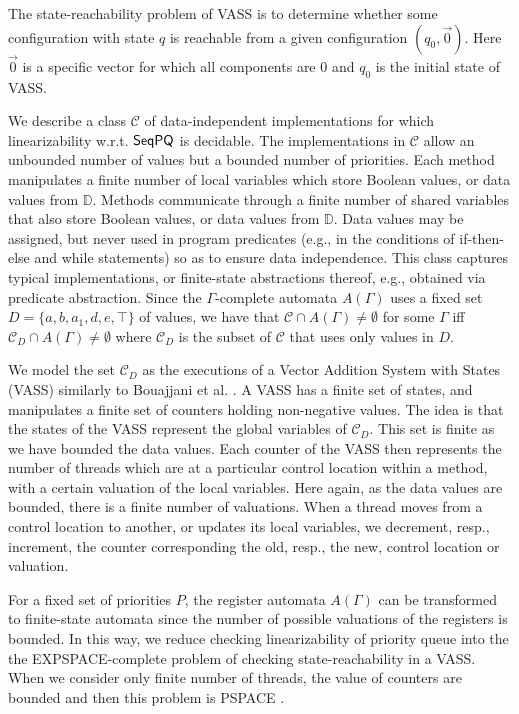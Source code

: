 The state-reachability problem of VASS is to determine whether some configuration with state $q$ is reachable from a given configuration $(q_0,\vec 0)$. Here $\vec 0$ is a specific vector for which all components are $0$ and $q_0$ is the initial state of VASS.


 We describe a class $\mathcal{C}$ of data-independent implementations for which linearizability w.r.t. $\mathsf{SeqPQ}$ is decidable. The implementations in $\mathcal{C}$ allow an unbounded number of values but a bounded number of priorities. Each method manipulates a finite number of local variables which store Boolean values, or data values from $\mathbb{D}$. Methods communicate through a finite number of shared variables that also store Boolean values, or data values from $\mathbb{D}$. Data values may be assigned, but never used in program predicates (e.g., in the conditions of if-then-else and while statements) so as to ensure data independence. This class captures typical implementations, or finite-state abstractions thereof, e.g., obtained via predicate abstraction. Since the $\Gamma$-complete automata $A(\Gamma)$ uses a fixed set $D=\{a,b,a_1,d,e,\top\}$ of values, we have that $\mathcal{C}\cap A(\Gamma)\neq\emptyset$ for some $\Gamma$ iff $\mathcal{C}_D\cap A(\Gamma)\neq\emptyset$ where $\mathcal{C}_D$ is the subset of $\mathcal{C}$ that uses only values in $D$.

We model the set $\mathcal{C}_D$ as the executions of a Vector Addition System with States (VASS) similarly to Bouajjani et al. \cite{conf/esop/BouajjaniEEH13}. A VASS has a finite set of states, and manipulates a finite set of counters holding non-negative values. The idea is that the states of the VASS represent the global variables of $\mathcal{C}_D$. This set is finite as we have bounded the data values. Each counter of the VASS then represents the number of threads which are at a particular control location within a method, with a certain valuation of the local variables. Here again, as the data values are bounded, there is a finite number of valuations. When a thread moves from a control location to another, or updates its local variables, we decrement, resp., increment, the counter corresponding the old, resp., the new, control location or valuation.

For a fixed set of priorities $P$, the register automata $A(\Gamma)$ can be transformed to finite-state automata since the number of possible valuations of the registers is bounded. In this way, we reduce checking linearizability of priority queue into the the EXPSPACE-complete problem of checking state-reachability in a VASS. When we consider only finite number of threads, the value of counters are bounded and then this problem is PSPACE \cite{DBLP:conf/ac/Esparza96}.


